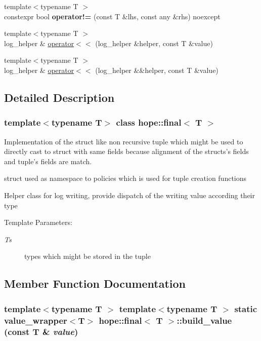 \begin{CompactItemize}
\item 
\hypertarget{classhope_1_1final_2c688c778ddbcaf0f12f719776c42ebf}{
{\footnotesize template$<$typename T $>$ }\\constexpr bool \textbf{operator!=} (const T \&lhs, const any \&rhs) noexcept}
\label{classhope_1_1final_2c688c778ddbcaf0f12f719776c42ebf}

\item 
{\footnotesize template$<$typename T $>$ }\\log\_\-helper \& \hyperlink{classhope_1_1final_4b8322ee0fd5ae2a2a0a9052876e6f8d}{operator$<$$<$} (log\_\-helper \&helper, const T \&value)
\item 
{\footnotesize template$<$typename T $>$ }\\log\_\-helper \& \hyperlink{classhope_1_1final_e477d848d5b78d071e802988f5d72584}{operator$<$$<$} (log\_\-helper \&\&helper, const T \&value)
\end{CompactItemize}


\subsection{Detailed Description}
\subsubsection*{template$<$typename T$>$ class hope::final$<$ T $>$}

Implementation of the struct like non recursive tuple which might be used to directly cast to struct with same fields because alignment of the structs's fields and tuple's fields are match. 

struct used as namespace to policies which is used for tuple creation functions

Helper class for log writing, provide dispatch of the writing value according their type

\begin{Desc}
\item[Template Parameters:]
\begin{description}
\item[{\em Ts}]types which might be stored in the tuple \end{description}
\end{Desc}


\subsection{Member Function Documentation}
\hypertarget{classhope_1_1final_3c394b218c24c4d9795f84c1d1f0bf2d}{
\subsubsection[{build\_\-value}]{\setlength{\rightskip}{0pt plus 5cm}template$<$typename T $>$ template$<$typename T $>$ static value\_\-wrapper$<$T$>$ {\bf hope::final}$<$ T $>$::build\_\-value (const T \& {\em value})}}
\label{classhope_1_1final_3c394b218c24c4d9795f84c1d1f0bf2d}


